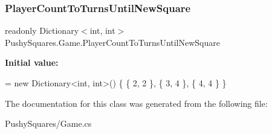 \subsubsection{\texorpdfstring{Player\+Count\+To\+Turns\+Until\+New\+Square}{PlayerCountToTurnsUntilNewSquare}}
{\footnotesize\ttfamily readonly Dictionary$<$int, int$>$ Pushy\+Squares.\+Game.\+Player\+Count\+To\+Turns\+Until\+New\+Square\hspace{0.3cm}{\ttfamily [static]}}

{\bfseries Initial value\+:}
\begin{DoxyCode}
= \textcolor{keyword}{new} Dictionary<int, int>() \{
            \{ 2, 2 \},
            \{ 3, 4 \},
            \{ 4, 4 \}
        \}
\end{DoxyCode}


The documentation for this class was generated from the following file\+:\begin{DoxyCompactItemize}
\item 
Pushy\+Squares/Game.\+cs\end{DoxyCompactItemize}
